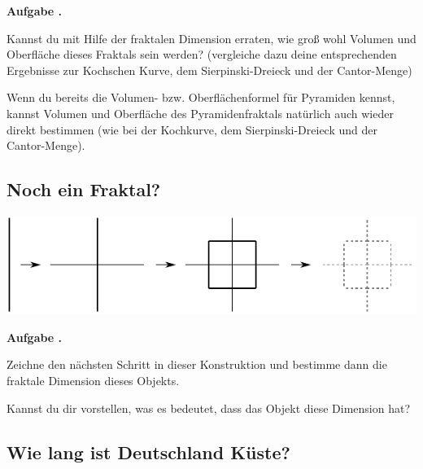 \documentclass[a4paper,ngerman,12pt]{scrartcl}
\theoremstyle{definition}
\theoremstyle{plain}
\theoremstyle{remark}
\newlength{\aufgabenskip}
\newcounter{aufgabennummer}
\newenvironment{aufgabe}[1]{
  \addtocounter{aufgabennummer}{1}
  \textbf{Aufgabe \theaufgabennummer.} \emph{#1} \par
}{\vspace{\aufgabenskip}}
\begin{document}
\begin{aufgabe}{}
	Kannst du mit Hilfe der fraktalen Dimension erraten,  wie groß wohl Volumen und Oberfläche dieses Fraktals sein werden? (vergleiche dazu deine entsprechenden Ergebnisse zur Kochschen Kurve, dem Sierpinski-Dreieck und der Cantor-Menge) 
	
	Wenn du bereits die Volumen- bzw. Oberflächenformel für Pyramiden kennst, kannst Volumen und Oberfläche des Pyramidenfraktals natürlich auch wieder direkt bestimmen (wie bei der Kochkurve, dem Sierpinski-Dreieck und der Cantor-Menge).
\end{aufgabe}
 
%


\newpage

\subsection{Noch ein Fraktal?}

\begin{center}
	\includegraphics{Bilder/Nicht-Fraktal.pdf}
\end{center}

\begin{aufgabe}{}
	Zeichne den nächsten Schritt in dieser Konstruktion und bestimme dann die fraktale Dimension dieses Objekts.
	
	Kannst du dir vorstellen, was es bedeutet, dass das Objekt diese Dimension hat?
\end{aufgabe}

\subsection{Wie lang ist Deutschland Küste?}
\end{document}
